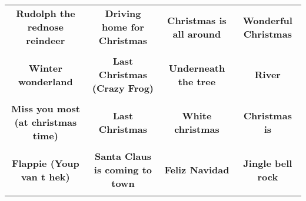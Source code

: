 \documentclass[12pt]{article} \usepackage{eso-pic, graphicx}
\newcommand{\background}[1]{%
\AddToShipoutPictureBG*{\texttt{[image: \#1]}}
}
\begin{document}
\tabcolsep=30.2pt \renewcommand{\arraystretch}{4.5}   \vspace*{4.3cm} \begin{center}  \begin{tabular}{c c c c}
\parbox{3cm}{\centering \textbf{Rudolph the rednose reindeer}}& 
\parbox{3cm}{\centering \textbf{Driving home for Christmas}}& 
\parbox{3cm}{\centering \textbf{Christmas is all around}}& 
\parbox{3cm}{\centering \textbf{Wonderful Christmas}}\\ \\ 
\parbox{3cm}{\centering \textbf{Winter wonderland}}& 
\parbox{3cm}{\centering \textbf{Last Christmas (Crazy Frog)}}& 
\parbox{3cm}{\centering \textbf{Underneath the tree}}& 
\parbox{3cm}{\centering \textbf{River}}\\ \\ 
\parbox{3cm}{\centering \textbf{Miss you most (at christmas time)}}& 
\parbox{3cm}{\centering \textbf{Last Christmas}}& 
\parbox{3cm}{\centering \textbf{White christmas}}& 
\parbox{3cm}{\centering \textbf{Christmas is}}\\ \\ 
\parbox{3cm}{\centering \textbf{Flappie (Youp van t hek)}}& 
\parbox{3cm}{\centering \textbf{Santa Claus is coming to town}}& 
\parbox{3cm}{\centering \textbf{Feliz Navidad}}& 
\parbox{3cm}{\centering \textbf{Jingle bell rock}}\\ \\ 
\end{tabular} \background{discobingo.pdf} \end{center} 
\end{document}
